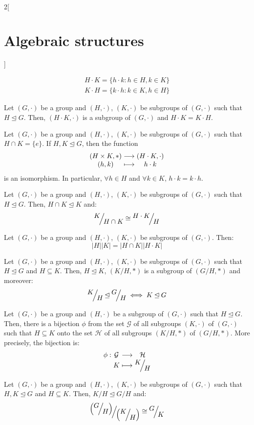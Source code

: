 \documentclass[../../../main_math.tex]{subfiles}
\begin{document}
\begin{multicols}{2}[\section{Algebraic structures}]
\begin{definition}
    \begin{gather*}
      H\cdot K=\{h\cdot k:h\in H,k\in K\}\\
      K\cdot H=\{k\cdot h:k\in K,h\in H\}
    \end{gather*}
  \end{definition}
  \begin{proposition}
    Let $(G,\cdot)$ be a group and $(H,\cdot)$, $(K,\cdot)$ be subgroups of $(G,\cdot)$ such that $H\unlhd G$. Then, $(H\cdot K,\cdot)$ is a subgroup of $(G,\cdot)$ and $H\cdot K=K\cdot H$.
  \end{proposition}
  \begin{proposition}
    Let $(G,\cdot)$ be a group and $(H,\cdot)$, $(K,\cdot)$ be subgroups of $(G,\cdot)$ such that $H\cap K=\{e\}$. If $H,K\unlhd G$, then the function
    $$\function{}{(H\times K,*)}{(H\cdot K,\cdot)}{(h,k)}{h\cdot k}$$
    is an isomorphism. In particular, $\forall h\in H$ and $\forall k\in K$, $h\cdot k=k\cdot h$.
  \end{proposition}
  \begin{theorem}
    Let $(G,\cdot)$ be a group and $(H,\cdot)$, $(K,\cdot)$ be subgroups of $(G,\cdot)$ such that $H\unlhd G$. Then, $H\cap K\unlhd K$ and: $$\quot{K}{H\cap K}\cong\quot{H\cdot K}{H}$$
  \end{theorem}
  \begin{corollary}
    Let $(G,\cdot)$ be a group and $(H,\cdot)$, $(K,\cdot)$ be subgroups of $(G,\cdot)$. Then: $$|H||K|=|H\cap K||H\cdot K|$$
  \end{corollary}
  \begin{lemma}
    Let $(G,\cdot)$ be a group and $(H,\cdot)$, $(K,\cdot)$ be subgroups of $(G,\cdot)$ such that $H\unlhd G$ and $H\subseteq K$. Then, $H\unlhd K$, $(K/H,*)$ is a subgroup of $(G/H,*)$ and moreover: $$\quot{K}{H}\unlhd\quot{G}{H}\iff K\unlhd G$$
  \end{lemma}
  \begin{theorem}
    Let $(G,\cdot)$ be a group and $(H,\cdot)$ be a subgroup of $(G,\cdot)$ such that $H\unlhd G$. Then, there is a bijection $\phi$ from the set $\mathcal{G}$ of all subgroups $(K,\cdot)$ of $(G,\cdot)$ such that $H\subseteq K$ onto the set $\mathcal{H}$ of all subgroups $\left(K/H,*\right)$ of $\left(G/H,*\right)$. More precisely, the bijection is:
    $$\function{\phi}{\mathcal{G}}{\mathcal{H}}{K}{\displaystyle\quot{K}{H}}$$
  \end{theorem}
  \begin{theorem}
    Let $(G,\cdot)$ be a group and $(H,\cdot)$, $(K,\cdot)$ be subgroups of $(G,\cdot)$ such that $H,K\unlhd G$ and $H\subseteq K$. Then, $K/H\unlhd G/H$ and: $$\quot{\left(\quot{G}{H}\right)}{\left(\quot{K}{H}\right)}\cong\quot{G}{K}$$
  \end{theorem}

\end{multicols}
\end{document}
